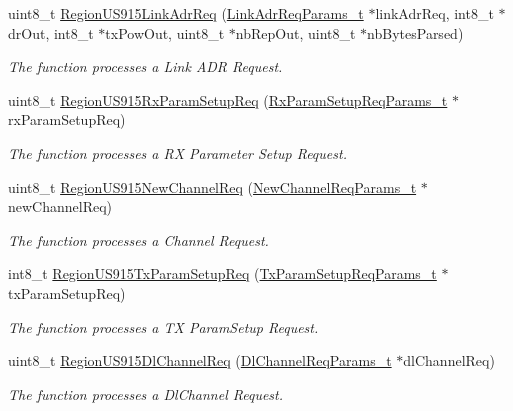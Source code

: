\begin{DoxyCompactItemize}
uint8\+\_\+t \hyperlink{group__REGIONUS915_gab4977ffc251303aaae4efec0eed63c23}{Region\+U\+S915\+Link\+Adr\+Req} (\hyperlink{group__REGION_gad4af503e8d4de1846129e26a799a1e8e}{Link\+Adr\+Req\+Params\+\_\+t} $\ast$link\+Adr\+Req, int8\+\_\+t $\ast$dr\+Out, int8\+\_\+t $\ast$tx\+Pow\+Out, uint8\+\_\+t $\ast$nb\+Rep\+Out, uint8\+\_\+t $\ast$nb\+Bytes\+Parsed)
\begin{DoxyCompactList}\small\item\em The function processes a Link A\+DR Request. \end{DoxyCompactList}\item 
uint8\+\_\+t \hyperlink{group__REGIONUS915_ga026be3770dc9e5787af7e181a142d47f}{Region\+U\+S915\+Rx\+Param\+Setup\+Req} (\hyperlink{group__REGION_ga7165f282c670c728c36d534df2285157}{Rx\+Param\+Setup\+Req\+Params\+\_\+t} $\ast$rx\+Param\+Setup\+Req)
\begin{DoxyCompactList}\small\item\em The function processes a RX Parameter Setup Request. \end{DoxyCompactList}\item 
uint8\+\_\+t \hyperlink{group__REGIONUS915_gaf6b93716eae04bcc5a2072b2f071fb0d}{Region\+U\+S915\+New\+Channel\+Req} (\hyperlink{group__REGION_gae2abcdb6dbb843c9faf5fd3009eca9d6}{New\+Channel\+Req\+Params\+\_\+t} $\ast$new\+Channel\+Req)
\begin{DoxyCompactList}\small\item\em The function processes a Channel Request. \end{DoxyCompactList}\item 
int8\+\_\+t \hyperlink{group__REGIONUS915_ga3d328f69d8417596e26845406dd6b878}{Region\+U\+S915\+Tx\+Param\+Setup\+Req} (\hyperlink{group__REGION_ga26836ef2996e70410e42ef471073f855}{Tx\+Param\+Setup\+Req\+Params\+\_\+t} $\ast$tx\+Param\+Setup\+Req)
\begin{DoxyCompactList}\small\item\em The function processes a TX Param\+Setup Request. \end{DoxyCompactList}\item 
uint8\+\_\+t \hyperlink{group__REGIONUS915_gaa4cc824d120b1ef55d88fae38282f8bc}{Region\+U\+S915\+Dl\+Channel\+Req} (\hyperlink{group__REGION_gae0d608ff1f8ea0a430e4f9a4c38ec7f3}{Dl\+Channel\+Req\+Params\+\_\+t} $\ast$dl\+Channel\+Req)
\begin{DoxyCompactList}\small\item\em The function processes a Dl\+Channel Request. \end{DoxyCompactList}\item 

\end{DoxyCompactItemize}
